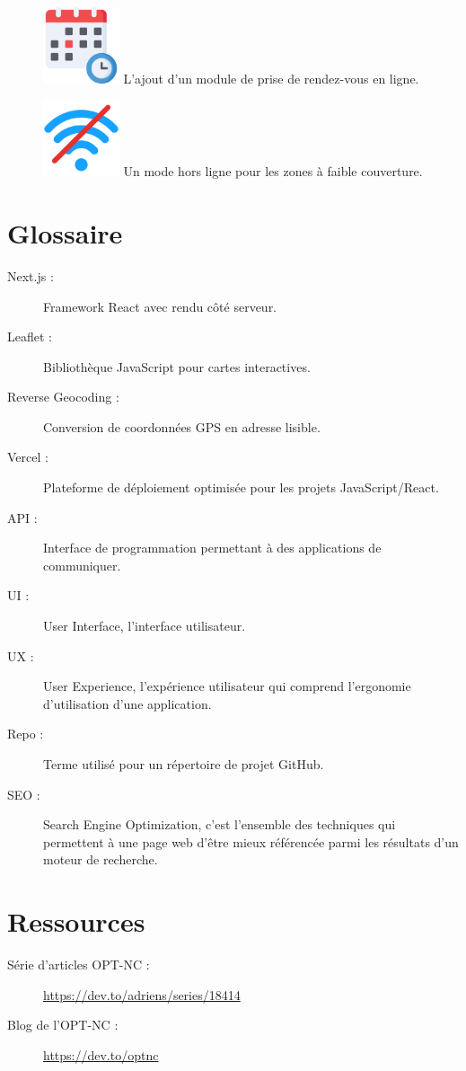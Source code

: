 \documentclass[12pt,a4paper]{report}
\begin{document}
\vspace{1cm}
\begin{figure}[h] %
    \centering
    \includegraphics[width=0.2\textwidth]{ressources_rapport/rdv.png}
    L’ajout d’un module de prise de rendez-vous en ligne.
\end{figure}

\vspace{1cm}
\begin{figure}[h] %
    \centering
    \includegraphics[width=0.2\textwidth]{ressources_rapport/offline.png}
    Un mode hors ligne pour les zones à faible couverture.
\end{figure}

\chapter{Glossaire}
\begin{description}
    \item[Next.js :] Framework React avec rendu côté serveur.
    \item[Leaflet :] Bibliothèque JavaScript pour cartes interactives.
    \item[Reverse Geocoding :] Conversion de coordonnées GPS en adresse lisible.
    \item[Vercel :] Plateforme de déploiement optimisée pour les projets JavaScript/React.
    \item[API :] Interface de programmation permettant à des applications de communiquer.
    \item[UI :] User Interface, l'interface utilisateur.
    \item[UX :] User Experience, l'expérience utilisateur qui comprend l'ergonomie d'utilisation d'une application.
    \item[Repo :] Terme utilisé pour un répertoire de projet GitHub.
    \item[SEO :] Search Engine Optimization, c'est l'ensemble des techniques qui permettent à une page web d'être mieux référencée parmi les résultats d'un moteur de recherche.
\end{description}

\chapter{Ressources}
\begin{description}
    \item[Série d'articles OPT-NC :] \href{https://dev.to/adriens/series/18414}{https://dev.to/adriens/series/18414}
    \item[Blog de l'OPT-NC :] \href{https://dev.to/optnc}{https://dev.to/optnc}
\end{description}
\end{document}
